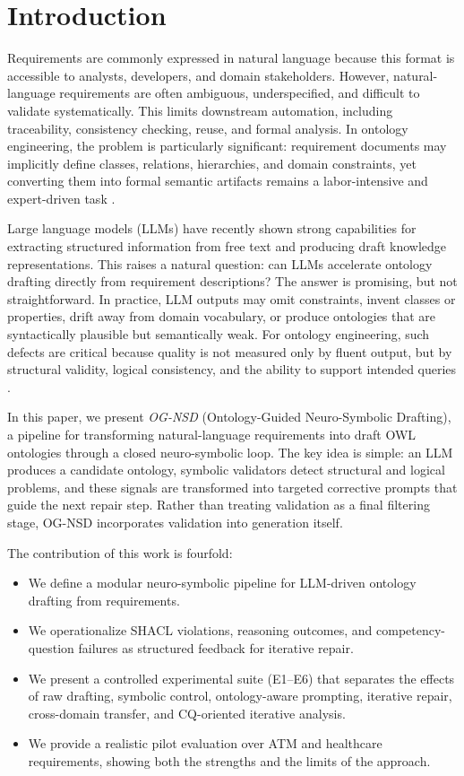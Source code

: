 \section{Introduction}

Requirements are commonly expressed in natural language because this format is accessible to analysts, developers, and domain stakeholders. However, natural-language requirements are often ambiguous, underspecified, and difficult to validate systematically. This limits downstream automation, including traceability, consistency checking, reuse, and formal analysis. In ontology engineering, the problem is particularly significant: requirement documents may implicitly define classes, relations, hierarchies, and domain constraints, yet converting them into formal semantic artifacts remains a labor-intensive and expert-driven task \cite{gruber1993,uschold1996}.

Large language models (LLMs) have recently shown strong capabilities for extracting structured information from free text and producing draft knowledge representations. This raises a natural question: can LLMs accelerate ontology drafting directly from requirement descriptions? The answer is promising, but not straightforward. In practice, LLM outputs may omit constraints, invent classes or properties, drift away from domain vocabulary, or produce ontologies that are syntactically plausible but semantically weak. For ontology engineering, such defects are critical because quality is not measured only by fluent output, but by structural validity, logical consistency, and the ability to support intended queries \cite{garcia2024thesis,garijo2025,saeedizade2024}.

In this paper, we present \emph{OG-NSD} (Ontology-Guided Neuro-Symbolic Drafting), a pipeline for transforming natural-language requirements into draft OWL ontologies through a closed neuro-symbolic loop. The key idea is simple: an LLM produces a candidate ontology, symbolic validators detect structural and logical problems, and these signals are transformed into targeted corrective prompts that guide the next repair step. Rather than treating validation as a final filtering stage, OG-NSD incorporates validation into generation itself.

The contribution of this work is fourfold:
\begin{itemize}
  \item We define a modular neuro-symbolic pipeline for LLM-driven ontology drafting from requirements.
  \item We operationalize SHACL violations, reasoning outcomes, and competency-question failures as structured feedback for iterative repair.
  \item We present a controlled experimental suite (E1--E6) that separates the effects of raw drafting, symbolic control, ontology-aware prompting, iterative repair, cross-domain transfer, and CQ-oriented iterative analysis.
  \item We provide a realistic pilot evaluation over ATM and healthcare requirements, showing both the strengths and the limits of the approach.
\end{itemize}

